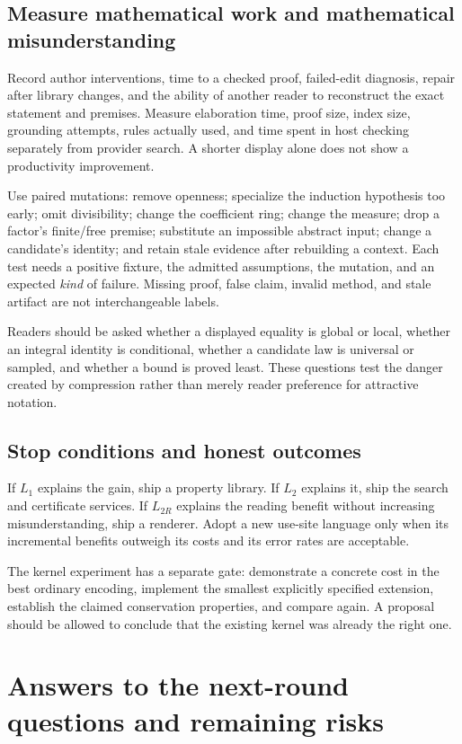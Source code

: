 \documentclass[11pt,letterpaper]{article}
\theoremstyle{definition}\newtheorem{definition}[theorem]{Definition}
\theoremstyle{remark}\newtheorem{remark}[theorem]{Remark}
\begin{document}
\subsection{Measure mathematical work and mathematical misunderstanding}
Record author interventions, time to a checked proof, failed-edit diagnosis,
repair after library changes, and the ability of another reader to reconstruct
the exact statement and premises. Measure elaboration time, proof size,
index size, grounding attempts, rules actually used, and time spent in host
checking separately from provider search. A shorter display alone does not
show a productivity improvement.

Use paired mutations: remove openness; specialize the induction hypothesis
too early; omit divisibility; change the coefficient ring; change the measure;
drop a factor's finite/free premise; substitute an impossible abstract input;
change a candidate's identity; and retain stale evidence after rebuilding a
context. Each test needs a positive fixture, the admitted assumptions, the
mutation, and an expected \emph{kind} of failure. Missing proof, false claim,
invalid method, and stale artifact are not interchangeable labels.

Readers should be asked whether a displayed equality is global or local,
whether an integral identity is conditional, whether a candidate law is
universal or sampled, and whether a bound is proved least. These questions
test the danger created by compression rather than merely reader preference
for attractive notation.

\subsection{Stop conditions and honest outcomes}
If $L_1$ explains the gain, ship a property library. If $L_2$ explains it,
ship the search and certificate services. If $L_{2R}$ explains the reading
benefit without increasing misunderstanding, ship a renderer. Adopt a new
use-site language only when its incremental benefits outweigh its costs and
its error rates are acceptable.

The kernel experiment has a separate gate: demonstrate a concrete cost in
the best ordinary encoding, implement the smallest explicitly specified
extension, establish the claimed conservation properties, and compare again.
A proposal should be allowed to conclude that the existing kernel was already
the right one.

\section{Answers to the next-round questions and remaining risks}
\end{document}

